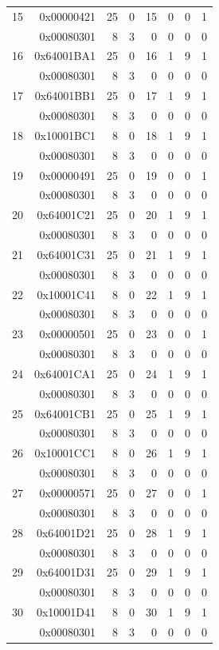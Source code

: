 \begin{longtable}{r r r r r r r r}
15 & 0x00000421 & 25 & 0 & 15 & 0 & 0 & 1 \\
  & 0x00080301 & 8 & 3 & 0 & 0 & 0 & 0 \\
16 & 0x64001BA1 & 25 & 0 & 16 & 1 & 9 & 1 \\
  & 0x00080301 & 8 & 3 & 0 & 0 & 0 & 0 \\
17 & 0x64001BB1 & 25 & 0 & 17 & 1 & 9 & 1 \\
  & 0x00080301 & 8 & 3 & 0 & 0 & 0 & 0 \\
18 & 0x10001BC1 & 8 & 0 & 18 & 1 & 9 & 1 \\
  & 0x00080301 & 8 & 3 & 0 & 0 & 0 & 0 \\
19 & 0x00000491 & 25 & 0 & 19 & 0 & 0 & 1 \\
  & 0x00080301 & 8 & 3 & 0 & 0 & 0 & 0 \\
20 & 0x64001C21 & 25 & 0 & 20 & 1 & 9 & 1 \\
  & 0x00080301 & 8 & 3 & 0 & 0 & 0 & 0 \\
21 & 0x64001C31 & 25 & 0 & 21 & 1 & 9 & 1 \\
  & 0x00080301 & 8 & 3 & 0 & 0 & 0 & 0 \\
22 & 0x10001C41 & 8 & 0 & 22 & 1 & 9 & 1 \\
  & 0x00080301 & 8 & 3 & 0 & 0 & 0 & 0 \\
23 & 0x00000501 & 25 & 0 & 23 & 0 & 0 & 1 \\
  & 0x00080301 & 8 & 3 & 0 & 0 & 0 & 0 \\
24 & 0x64001CA1 & 25 & 0 & 24 & 1 & 9 & 1 \\
  & 0x00080301 & 8 & 3 & 0 & 0 & 0 & 0 \\
25 & 0x64001CB1 & 25 & 0 & 25 & 1 & 9 & 1 \\
  & 0x00080301 & 8 & 3 & 0 & 0 & 0 & 0 \\
26 & 0x10001CC1 & 8 & 0 & 26 & 1 & 9 & 1 \\
  & 0x00080301 & 8 & 3 & 0 & 0 & 0 & 0 \\
27 & 0x00000571 & 25 & 0 & 27 & 0 & 0 & 1 \\
  & 0x00080301 & 8 & 3 & 0 & 0 & 0 & 0 \\
28 & 0x64001D21 & 25 & 0 & 28 & 1 & 9 & 1 \\
  & 0x00080301 & 8 & 3 & 0 & 0 & 0 & 0 \\
29 & 0x64001D31 & 25 & 0 & 29 & 1 & 9 & 1 \\
  & 0x00080301 & 8 & 3 & 0 & 0 & 0 & 0 \\
30 & 0x10001D41 & 8 & 0 & 30 & 1 & 9 & 1 \\
  & 0x00080301 & 8 & 3 & 0 & 0 & 0 & 0 \\

\end{longtable}
